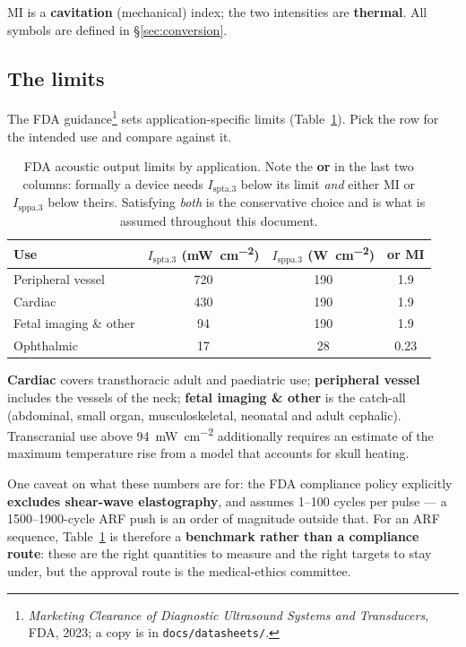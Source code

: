 \documentclass[11pt,a4paper]{article}
\begin{document}
MI is a \textbf{cavitation} (mechanical) index; the two intensities are \textbf{thermal}. All symbols
are defined in \S\ref{sec:conversion}.

\subsection{The limits}\label{sec:limits}
The FDA guidance\footnote{\emph{Marketing Clearance of Diagnostic Ultrasound Systems and Transducers},
FDA, 2023; a copy is in \texttt{docs/datasheets/}.} sets application-specific limits
(Table~\ref{tab:fdalimits}). Pick the row for the intended use and compare against it.

\begin{table}[h]
\centering
\small
\caption{FDA acoustic output limits by application. Note the \textbf{or} in the last two columns:
formally a device needs $I_\mathrm{spta.3}$ below its limit \emph{and} either MI or
$I_\mathrm{sppa.3}$ below theirs. Satisfying \emph{both} is the conservative choice and is what is
assumed throughout this document.}
\label{tab:fdalimits}
\begin{tabular}{lccc}
\toprule
Use & $I_\mathrm{spta.3}$ (\si{\milli\watt\per\square\centi\metre})
    & $I_\mathrm{sppa.3}$ (\si{\watt\per\square\centi\metre}) & \textbf{or} MI \\
\midrule
Peripheral vessel        & 720 & 190 & 1.9 \\
Cardiac                  & 430 & 190 & 1.9 \\
Fetal imaging \& other   &  94 & 190 & 1.9 \\
Ophthalmic               &  17 &  28 & 0.23 \\
\bottomrule
\end{tabular}
\end{table}

\noindent
\textbf{Cardiac} covers transthoracic adult and paediatric use; \textbf{peripheral vessel} includes
the vessels of the neck; \textbf{fetal imaging \& other} is the catch-all (abdominal, small organ,
musculoskeletal, neonatal and adult cephalic). Transcranial use above
\SI{94}{\milli\watt\per\square\centi\metre} additionally requires an estimate of the maximum
temperature rise from a model that accounts for skull heating.

One caveat on what these numbers are for: the FDA compliance policy explicitly \textbf{excludes
shear-wave elastography}, and assumes 1--100 cycles per pulse --- a 1500--1900-cycle ARF push is an
order of magnitude outside that. For an ARF sequence, Table~\ref{tab:fdalimits} is therefore a
\textbf{benchmark rather than a compliance route}: these are the right quantities to measure and the
right targets to stay under, but the approval route is the medical-ethics committee.
\end{document}
